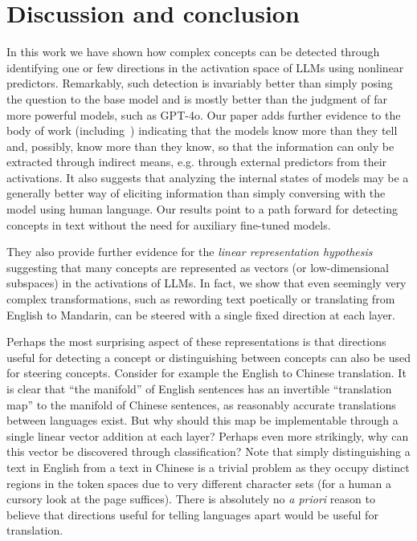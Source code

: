 \section{Discussion and conclusion}

In this work we have shown how complex concepts can be detected through identifying one or few directions in the activation space of LLMs using nonlinear predictors. Remarkably, such detection is invariably better than simply posing the question to the base model and is mostly better than the judgment of  far more powerful models, such as GPT-4o. Our paper adds further evidence to the body of work (including~\citep{carlini2023scalableVideo, wei2022chain, representation_engineering, gottesman2024estimating})  indicating that the models know more than they tell and, possibly, know more than they know, so that the information can only be extracted through indirect means, e.g.  through external predictors from their activations. It also  suggests that analyzing the internal states of models may be a generally better way of eliciting information than simply conversing with the model using human language. Our results point to a path forward for detecting concepts in text without the need for auxiliary fine-tuned models.

They also provide further evidence for the {\it linear representation hypothesis}~\citep{mikolov2013linguistic, pennington2014glove} suggesting that many concepts are represented as vectors (or low-dimensional subspaces) in the activations of LLMs. In fact, we show that even seemingly very complex transformations, such as rewording text poetically or translating from English to Mandarin, can be steered with a single fixed direction at each layer. 

Perhaps the most surprising aspect of these representations is that directions useful for detecting a concept or distinguishing between concepts can also be used for steering concepts. Consider for example the English to Chinese translation. It is clear that ``the manifold'' of English sentences has an invertible ``translation map'' to the manifold of Chinese sentences, as reasonably accurate translations between languages exist. 
But why should this map be implementable through a single linear vector addition at each layer? Perhaps even more strikingly, why can this vector be discovered through classification?  Note that simply distinguishing a text in English from a text in Chinese is a trivial problem as they occupy distinct regions in the token spaces due to very different character sets (for a human a cursory look at the page suffices). There is absolutely no {\it a priori} reason to believe that directions useful for  telling languages apart would be useful for translation. 

